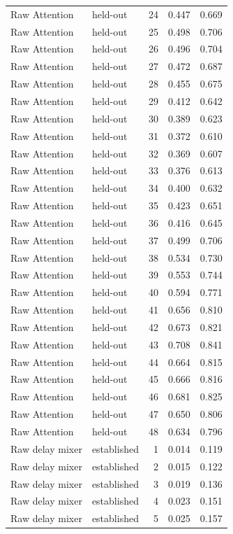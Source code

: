\begin{tabular}{llrrr}
Raw Attention & held-out & 24 & 0.447 & 0.669 \\
Raw Attention & held-out & 25 & 0.498 & 0.706 \\
Raw Attention & held-out & 26 & 0.496 & 0.704 \\
Raw Attention & held-out & 27 & 0.472 & 0.687 \\
Raw Attention & held-out & 28 & 0.455 & 0.675 \\
Raw Attention & held-out & 29 & 0.412 & 0.642 \\
Raw Attention & held-out & 30 & 0.389 & 0.623 \\
Raw Attention & held-out & 31 & 0.372 & 0.610 \\
Raw Attention & held-out & 32 & 0.369 & 0.607 \\
Raw Attention & held-out & 33 & 0.376 & 0.613 \\
Raw Attention & held-out & 34 & 0.400 & 0.632 \\
Raw Attention & held-out & 35 & 0.423 & 0.651 \\
Raw Attention & held-out & 36 & 0.416 & 0.645 \\
Raw Attention & held-out & 37 & 0.499 & 0.706 \\
Raw Attention & held-out & 38 & 0.534 & 0.730 \\
Raw Attention & held-out & 39 & 0.553 & 0.744 \\
Raw Attention & held-out & 40 & 0.594 & 0.771 \\
Raw Attention & held-out & 41 & 0.656 & 0.810 \\
Raw Attention & held-out & 42 & 0.673 & 0.821 \\
Raw Attention & held-out & 43 & 0.708 & 0.841 \\
Raw Attention & held-out & 44 & 0.664 & 0.815 \\
Raw Attention & held-out & 45 & 0.666 & 0.816 \\
Raw Attention & held-out & 46 & 0.681 & 0.825 \\
Raw Attention & held-out & 47 & 0.650 & 0.806 \\
Raw Attention & held-out & 48 & 0.634 & 0.796 \\
Raw delay mixer & established & 1 & 0.014 & 0.119 \\
Raw delay mixer & established & 2 & 0.015 & 0.122 \\
Raw delay mixer & established & 3 & 0.019 & 0.136 \\
Raw delay mixer & established & 4 & 0.023 & 0.151 \\
Raw delay mixer & established & 5 & 0.025 & 0.157 \\

\end{tabular}
